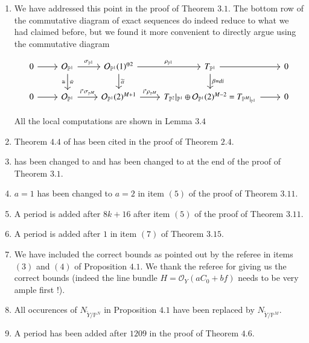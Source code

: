 \documentclass[11pt,twoside]{amsart}
\theoremstyle{plain}
\numberwithin{equation}{section}
\theoremstyle{definition}
\begin{document}
\begin{enumerate}

\item We have addressed this point in the proof of Theorem $3.1$. The bottom row of the commutative diagram of exact sequences do indeed reduce to what we had claimed before, but we found it more convenient to directly argue using the commutative diagram 

\[
\begin{tikzcd}
  0 \arrow[r] & \mathcal{O}_{\mathbb{P}^1} \arrow[r, "\sigma_{\mathbb{P}^1}"] \arrow[d, "\Bar{w}", "\cong"'] & \mathcal{O}_{\mathbb{P}^1}(1)^{\oplus 2} \arrow[r, "\rho_{\mathbb{P}^1}"] \arrow[d, "\widetilde{\alpha}"] & T_{\mathbb{P}^1} \arrow[r] \arrow[d, "\beta = di"] & 0 \\
   0 \arrow[r] & \mathcal{O}_{\mathbb{P}^1} \arrow[r, "i^*\sigma_{\mathbb{P}^M}"] & \mathcal{O}_{\mathbb{P}^1}(2)^{M+1} \arrow[r, "i^*\rho_{\mathbb{P}^M}"] & T_{\mathbb{P}^2}|_{\mathbb{P}^1} \oplus \mathcal{O}_{\mathbb{P}^1}(2)^{M-2} = T_{\mathbb{P}^M|_{\mathbb{P}^1}} \arrow[r] & 0
\end{tikzcd}
\]

All the local computations are shown in Lemma $3.4$

\item Theorem $4.4$ of \cite{BMR21} has been cited in the proof of Theorem $2.4$.

\item \cite[Lemma $2.6$, (iii)]{BMR21} has been changed to \cite[Lemma $2.5$, $(4)$]{BMR21} and \cite[Lemma $2.5$ (iii)] {BMR21} has been changed to \cite[Lemma $2.5$, $(3)$]{BMR21} at the end of the proof of Theorem $3.1$.

\item $a = 1$ has been changed to $a = 2$ in item $(5)$ of the proof of Theorem $3.11$.

\item A period is added after $8k+16$ after item $(5)$ of the proof of Theorem $3.11$.

\item A period is added after $1$ in item $(7)$ of Theorem $3.15$.

\item We have included the correct bounds as pointed out by the referee in items $(3)$ and $(4)$ of Proposition $4.1$. We thank the referee for giving us the correct bounds (indeed the line bundle $H = \mathcal{O}_Y(aC_0+bf)$ needs to be very ample first !).

\item All occurences of $N_{\widetilde{Y}/\mathbb{P}^N}$ in Proposition $4.1$ have been replaced by $N_{\widetilde{Y}/\mathbb{P}^M}$.

\item A period has been added after $1209$ in the proof of Theorem $4.6$.


\end{enumerate}
\end{document}
